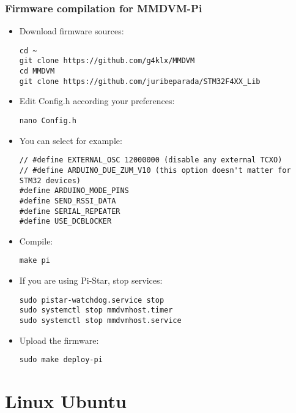 \documentclass[]{article}
\begin{document}
\subsubsection{Firmware compilation for MMDVM-Pi}

\begin{itemize}[leftmargin=*]
	
\item Download firmware sources:
\begin{lstlisting}[style=DOS]
cd ~
git clone https://github.com/g4klx/MMDVM
cd MMDVM
git clone https://github.com/juribeparada/STM32F4XX_Lib
\end{lstlisting}

\item Edit Config.h according your preferences:
\begin{lstlisting}[style=DOS]
nano Config.h
\end{lstlisting}

\item You can select for example:

\begin{verbatim}
// #define EXTERNAL_OSC 12000000 (disable any external TCXO)
// #define ARDUINO_DUE_ZUM_V10 (this option doesn't matter for STM32 devices)
#define ARDUINO_MODE_PINS
#define SEND_RSSI_DATA
#define SERIAL_REPEATER
#define USE_DCBLOCKER
\end{verbatim}

\item Compile:
\begin{lstlisting}[style=DOS]
make pi
\end{lstlisting}

\item If you are using Pi-Star, stop services:

\begin{lstlisting}[style=DOS]
sudo pistar-watchdog.service stop
sudo systemctl stop mmdvmhost.timer
sudo systemctl stop mmdvmhost.service
\end{lstlisting}

\item Upload the firmware:
\begin{lstlisting}[style=DOS]
sudo make deploy-pi
\end{lstlisting}

\end{itemize}

\section{Linux Ubuntu}
\end{document}
